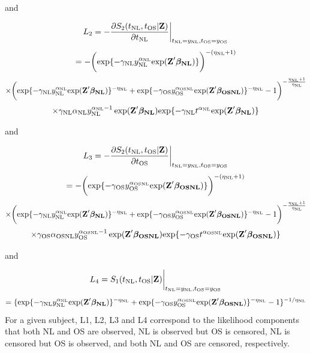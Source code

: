 \documentclass[12pt]{article}
\begin{document}
and

$$
L_2=-\frac{\partial S_2(t_{\rm NL}, t_{\rm OS}|\textbf{Z})}{\partial t_{\rm NL}}\bigg|_{t_{\rm NL}=y_{\rm NL},t_{\rm OS}=y_{\rm OS}}
$$
$$
=-\bigg(\mathrm{exp}\{-\gamma_{\rm NL} y_{\rm NL}^{\alpha_{\rm NL}}
\mathrm{exp}(\textbf{Z}' \boldsymbol{\beta_{\rm NL}} )\}\bigg)^{-(\eta_{\rm NL}+1)}
$$
$$
\times \bigg(\mathrm{exp}\{-\gamma_{\rm NL} y_{\rm NL}^{\alpha_{\rm NL}}
\mathrm{exp}(\textbf{Z}' \boldsymbol{\beta_{\rm NL}} )\}^{-\eta_{\rm NL}}+\mathrm{exp}\{-\gamma_{\rm OS} y_{\rm OS}^{\alpha_{\rm OSNL}}
\mathrm{exp}(\textbf{Z}' \boldsymbol{\beta_{\rm OSNL}} )\}^{-\eta_{\rm NL}}-1\bigg)^{-\frac{\eta_{\rm NL}+1}{\eta_{\rm NL}}}
$$
$$
\times \gamma_{\rm NL} \alpha_{\rm NL} y_{\rm NL}^{{\alpha_{\rm NL} -1}} \exp(\textbf{Z}' \boldsymbol{\beta_{\rm NL}}) \mathrm{exp}\{-\gamma_{\rm NL} t^{\alpha_{\rm NL}}
\mathrm{exp}(\textbf{Z}' \boldsymbol{\beta_{\rm NL}} )\}
$$

and

$$
L_3=-\frac{\partial S_2(t_{\rm NL}, t_{\rm OS}|\textbf{Z})}{\partial t_{\rm OS}}\bigg|_{t_{\rm NL}=y_{\rm NL},t_{\rm OS}=y_{\rm OS}}
$$
$$
=-\bigg(\mathrm{exp}\{-\gamma_{\rm OS} y_{\rm OS}^{\alpha_{\rm OSNL}}
\mathrm{exp}(\textbf{Z}' \boldsymbol{\beta_{\rm OSNL}} )\}\bigg)^{-(\eta_{\rm NL}+1)}
$$
$$
\times \bigg(\mathrm{exp}\{-\gamma_{\rm NL} y_{\rm NL}^{\alpha_{\rm NL}}
\mathrm{exp}(\textbf{Z}' \boldsymbol{\beta_{\rm NL}} )\}^{-\eta_{\rm NL}}+\mathrm{exp}\{-\gamma_{\rm OS} y_{\rm OS}^{\alpha_{\rm OSNL}}
\mathrm{exp}(\textbf{Z}' \boldsymbol{\beta_{\rm OSNL}} )\}^{-\eta_{\rm NL}}-1\bigg)^{-\frac{\eta_{\rm NL}+1}{\eta_{\rm NL}}}
$$
$$
\times \gamma_{\rm OS} \alpha_{\rm OSNL} y_{\rm OS}^{{\alpha_{\rm OSNL} -1}} \exp(\textbf{Z}' \boldsymbol{\beta_{\rm OSNL}}) \mathrm{exp}\{-\gamma_{\rm OS} t^{\alpha_{\rm OSNL}}
\mathrm{exp}(\textbf{Z}' \boldsymbol{\beta_{\rm OSNL}} )\}
$$

and

$$
L_4=S_1(t_{\rm NL}, t_{\rm OS}|\textbf{Z})\bigg|_{t_{\rm NL}=y_{\rm NL},t_{\rm OS}=y_{\rm OS}}
$$
$$
=\{\mathrm{exp}\{-\gamma_{\rm NL} y_{\rm NL}^{\alpha_{\rm NL}}
\mathrm{exp}(\textbf{Z}' \boldsymbol{\beta_{\rm NL}} )\}^{-\eta_{\rm NL}}
+\mathrm{exp}\{-\gamma_{\rm OS} y_{\rm OS}^{\alpha_{\rm OSNL}}
\mathrm{exp}(\textbf{Z}' \boldsymbol{\beta_{\rm OSNL}} )\}^{-\eta_{\rm NL}}-1\}^{-1/\eta_{\rm NL}}
$$
For a given subject, L1, L2, L3 and L4 correspond to the likelihood components that both NL and OS are observed, NL is observed but OS is censored, NL is censored but OS is observed, and both NL and OS are censored, respectively.
\end{document}
